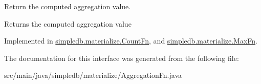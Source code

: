 Return the computed aggregation value. \begin{DoxyReturn}{Returns}
the computed aggregation value 
\end{DoxyReturn}


Implemented in \hyperlink{classsimpledb_1_1materialize_1_1CountFn_aba7aff6e83f0f0af171edb64be6cb342}{simpledb.\+materialize.\+Count\+Fn}, and \hyperlink{classsimpledb_1_1materialize_1_1MaxFn_a00a636276f06c0599ebbe3dbc560a4e6}{simpledb.\+materialize.\+Max\+Fn}.



The documentation for this interface was generated from the following file\+:\begin{DoxyCompactItemize}
\item 
src/main/java/simpledb/materialize/Aggregation\+Fn.\+java\end{DoxyCompactItemize}
